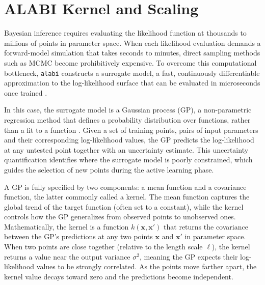 \documentclass[preprint]{aastex631}
\def\eg{{\it e.g., }}
\begin{document}



\appendix 

\section{ALABI Kernel and Scaling}

Bayesian inference requires evaluating the likelihood function at
thousands to millions of points in parameter space. When each
likelihood evaluation demands a forward-model simulation that takes
seconds to minutes, direct sampling methods such as MCMC become prohibitively expensive. To overcome this
computational bottleneck, \texttt{alabi} constructs a surrogate
model, a fast, continuously differentiable approximation to the
log-likelihood surface that can be evaluated in microseconds once
trained \citep[\eg][]{Fleming20}.

In this case, the surrogate model is a Gaussian process (GP), a non-parametric
regression method that defines a probability distribution over
functions, rather than a fit to a function
\citep{Rasmussen06}. Given a set of training points, pairs of
input parameters and their corresponding log-likelihood values, the
GP predicts the log-likelihood at any untested point together with an
uncertainty estimate. This uncertainty quantification identifies where the
surrogate model is poorly constrained, which  guides the selection of
new points during the active learning phase.

A GP is fully specified by two components: a mean function and a
covariance function, the latter commonly called a kernel. The
mean function captures the global trend of the target function (often
set to a constant), while the kernel controls how the GP generalizes
from observed points to unobserved ones. Mathematically, the kernel is a function
$k(\mathbf{x}, \mathbf{x}')$ that returns the covariance between the
GP's predictions at any two points $\mathbf{x}$ and $\mathbf{x}'$ in
parameter space. When two points are close together (relative to the
length scale $\ell$), the kernel returns a value near the output
variance $\sigma^{2}$, meaning the GP expects their log-likelihood
values to be strongly correlated. As the points move farther apart,
the kernel value decays toward zero and the predictions become
independent. 
\end{document}
